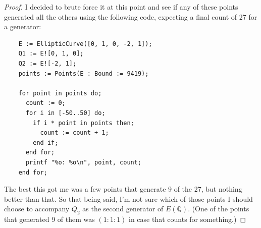 \documentclass[12pt]{article}
\theoremstyle{definition}
\begin{document}
\begin{proof}
	I decided to brute force it at this point and see if any of these points generated all the others using the following code, expecting a final count of 27 for a generator: \begin{verbatim}
    E := EllipticCurve([0, 1, 0, -2, 1]);
    Q1 := E![0, 1, 0];
    Q2 := E![-2, 1];
    points := Points(E : Bound := 9419);

    for point in points do;
      count := 0;
      for i in [-50..50] do;
        if i * point in points then;
          count := count + 1;
        end if;
      end for;
      printf "%o: %o\n", point, count;
    end for; \end{verbatim}
	The best this got me was a few points that generate 9 of the 27, but nothing better than that.
	So that being said, I'm not sure which of those points I should choose to accompany $Q_2$ as the second generator of $E(\mathbb{Q})$.
	(One of the points that generated 9 of them was $(1 : 1 : 1)$ in case that counts for something.)
\end{proof}
\end{document}
